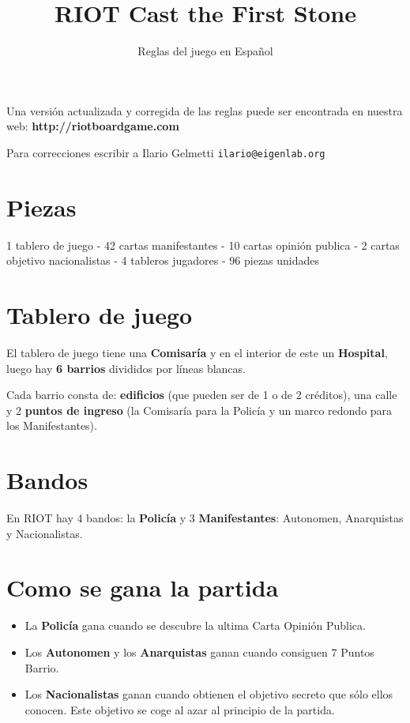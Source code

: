 \documentclass[a4paper,13pt]{scrartcl}
\title{RIOT Cast the First Stone}
\subtitle{Reglas del juego en Espa\~nol}
\author{}
\date{}
\begin{document}
\maketitle

Una versi\'on actualizada y corregida de las reglas puede ser encontrada en nuestra web:
\textbf{http://riotboardgame.com } 

Para correcciones escribir a Ilario Gelmetti \texttt{ilario@eigenlab.org}

\section*{Piezas}
1 tablero de juego - 42 cartas manifestantes - 10 cartas opini\'on publica - 2 cartas objetivo nacionalistas - 4
tableros jugadores - 96 piezas unidades

\section*{Tablero de juego}
El tablero de juego tiene una \textbf{Comisar\'ia} y en el interior de este un \textbf{Hospital}, luego hay \textbf{6 barrios} divididos por
l\'ineas blancas.

Cada barrio consta de: \textbf{edificios} (que pueden ser de 1 o de 2 cr\'editos), una calle y 2 \textbf{puntos de ingreso} (la
Comisar\'ia para la Polic\'ia y un marco redondo para los Manifestantes).

\section*{Bandos}
En RIOT hay 4 bandos: la \textbf{Polic\'ia} y 3 \textbf{Manifestantes}: Autonomen, Anarquistas y Nacionalistas.

\section*{Como se gana la partida}
\begin{itemize}
\item La \textbf{Polic\'ia} gana cuando se descubre la ultima Carta Opini\'on Publica.
\item Los \textbf{Autonomen} y los \textbf{Anarquistas} ganan cuando consiguen 7 Puntos Barrio.
\item Los \textbf{Nacionalistas} ganan cuando obtienen el objetivo secreto que s\'olo ellos conocen. Este objetivo se coge al
azar al principio de la partida.
\end{itemize}
\end{document}
